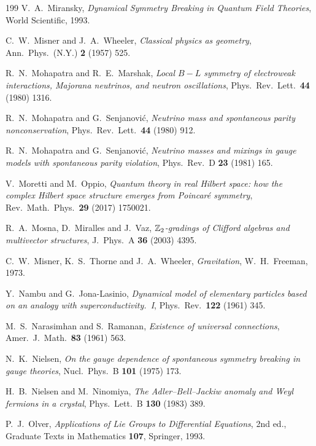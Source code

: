 \begin{thebibliography}{199}
 V.~A.~Miransky, \emph{Dynamical Symmetry Breaking in Quantum Field Theories}, World Scientific, 1993.

 C.~W.~Misner and J.~A.~Wheeler, \emph{Classical physics as geometry}, Ann.~Phys.~(N.Y.) \textbf{2} (1957) 525.

 R.~N.~Mohapatra and R.~E.~Marshak, \emph{Local $B-L$ symmetry of electroweak interactions, Majorana neutrinos, and neutron oscillations},
Phys.~Rev.~Lett.~\textbf{44} (1980) 1316.

 R.~N.~Mohapatra and G.~Senjanovi\'c, \emph{Neutrino mass and spontaneous parity nonconservation}, Phys.~Rev.~Lett.~\textbf{44} (1980) 912.

 R.~N.~Mohapatra and G.~Senjanovi\'c, \emph{Neutrino masses and mixings in gauge models with spontaneous parity violation},
Phys.~Rev.~D \textbf{23} (1981) 165.

 V.~Moretti and M.~Oppio, \emph{Quantum theory in real Hilbert space: how the complex Hilbert space structure emerges from Poincar\'e symmetry},
Rev.~Math.~Phys.~\textbf{29} (2017) 1750021.

 R.~A.~Mosna, D.~Miralles and J.~Vaz, \emph{$\mathbb{Z}_2$-gradings of Clifford algebras and multivector structures}, J.~Phys.~A \textbf{36} (2003) 4395.

 C.~W.~Misner, K.~S.~Thorne and J.~A.~Wheeler, \emph{Gravitation}, W.~H.~Freeman, 1973.

 Y.~Nambu and G.~Jona-Lasinio, \emph{Dynamical model of elementary particles based on an analogy with superconductivity.~I},
Phys.~Rev.~\textbf{122} (1961) 345.

 M.~S.~Narasimhan and S.~Ramanan, \emph{Existence of universal connections}, Amer.~J.~Math.~\textbf{83} (1961) 563.

 N.~K.~Nielsen, \emph{On the gauge dependence of spontaneous symmetry breaking in gauge theories}, Nucl.~Phys.~B \textbf{101} (1975) 173.

 H.~B.~Nielsen and M.~Ninomiya, \emph{The Adler--Bell--Jackiw anomaly and Weyl fermions in a crystal}, Phys.~Lett.~B \textbf{130} (1983) 389.

 P.~J.~Olver, \emph{Applications of Lie Groups to Differential Equations}, 2nd ed., Graduate Texts in Mathematics \textbf{107}, Springer, 1993.


\end{thebibliography}
